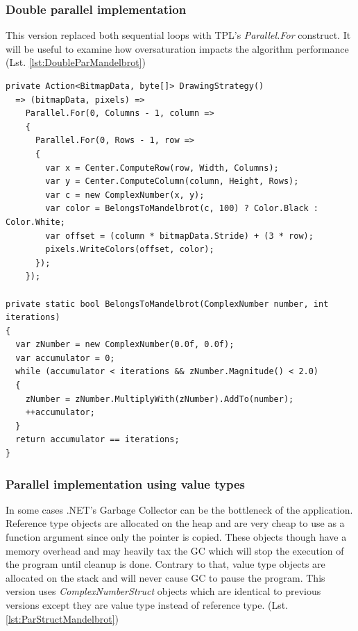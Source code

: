 \subsubsection{Double parallel implementation}
This version replaced both sequential loops with TPL's \emph{Parallel.For} construct. It will be useful to examine how oversaturation impacts the algorithm performance (Lst. \ref{lst:DoubleParMandelbrot})

\begin{lstlisting}[language={[sharp]c}, style=sharpcstyle, caption={Double parallel Mandelbrot algorithm}, label={lst:DoubleParMandelbrot}]
private Action<BitmapData, byte[]> DrawingStrategy()
  => (bitmapData, pixels) =>
    Parallel.For(0, Columns - 1, column =>
    {
      Parallel.For(0, Rows - 1, row =>
      {
        var x = Center.ComputeRow(row, Width, Columns);
        var y = Center.ComputeColumn(column, Height, Rows);
        var c = new ComplexNumber(x, y);
        var color = BelongsToMandelbrot(c, 100) ? Color.Black : Color.White;
        var offset = (column * bitmapData.Stride) + (3 * row);
        pixels.WriteColors(offset, color);
      });
    });

private static bool BelongsToMandelbrot(ComplexNumber number, int iterations)
{
  var zNumber = new ComplexNumber(0.0f, 0.0f);
  var accumulator = 0;
  while (accumulator < iterations && zNumber.Magnitude() < 2.0)
  {
    zNumber = zNumber.MultiplyWith(zNumber).AddTo(number);
    ++accumulator;
  }
  return accumulator == iterations;
}
\end{lstlisting}

\subsubsection{Parallel implementation using value types}

In some cases .NET's Garbage Collector can be the bottleneck of the application. Reference type objects are allocated on the heap and are very cheap to use as a function argument since only the pointer is copied. These objects though have a memory overhead and may heavily tax the GC which will stop the execution of the program until cleanup is done. Contrary to that, value type objects are allocated on the stack and will never cause GC to pause the program. This version uses \emph{ComplexNumberStruct} objects which are identical to previous versions except they are value type instead of reference type.  (Lst. \ref{lst:ParStructMandelbrot})

